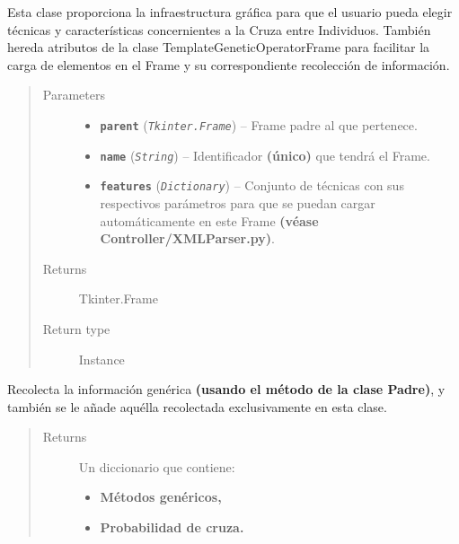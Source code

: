 \documentclass[class=report, crop=false]{standalone}
\begin{document}
\begin{fulllineitems}

\begin{DUlineblock}{0em}
\item[] Esta clase proporciona la infraestructura gráfica para que 
el usuario pueda elegir técnicas y características concernientes a 
la Cruza entre Individuos.\break
También hereda atributos de la clase TemplateGeneticOperatorFrame 
para facilitar la carga de elementos en el Frame y su correspondiente 
recolección de información.
\end{DUlineblock}

\begin{quote}\begin{description}
\item[{Parameters}] \leavevmode\begin{itemize}
\item \textbf{\texttt{parent}} (\emph{\texttt{Tkinter.Frame}}) -- Frame padre al que pertenece.
\item \textbf{\texttt{name}} (\emph{\texttt{String}}) -- Identificador \textbf{(único)} que tendrá el Frame.
\item \textbf{\texttt{features}} (\emph{\texttt{Dictionary}}) -- Conjunto de técnicas con sus respectivos parámetros para que se puedan cargar automáticamente en este Frame \textbf{(véase Controller/XMLParser.py)}.
\end{itemize}

\item[{Returns}] \leavevmode
Tkinter.Frame
\item[{Return type}] \leavevmode
Instance
\end{description}\end{quote}


\begin{fulllineitems}

Recolecta la información genérica \textbf{(usando el método de la clase Padre)}, 
y también se le añade aquélla recolectada exclusivamente 
en esta clase.

\begin{quote}\begin{description}
\item[{Returns}] \leavevmode

Un diccionario que contiene:

\begin{itemize}
\item \textbf{Métodos genéricos,}
\item \textbf{Probabilidad de cruza.}
\end{itemize}


\end{description}
\end{quote}
\end{fulllineitems}
\end{fulllineitems}
\end{document}

